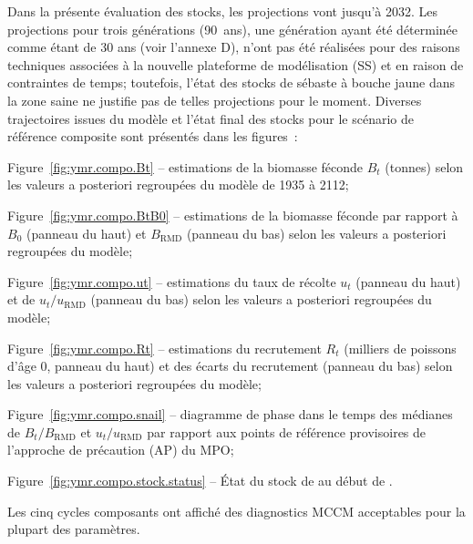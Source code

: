 \documentclass[11pt]{book}
\newcommand{\Bmsy}{B_\text{RMD}}
\newcommand{\umsy}{u_\text{RMD}}
\begin{document}
Dans la pr\'{e}sente \'{e}valuation des stocks, les projections vont jusqu'\`{a} 2032. 
Les projections pour trois g\'{e}n\'{e}rations (90~ans), une g\'{e}n\'{e}ration ayant \'{e}t\'{e} d\'{e}termin\'{e}e comme \'{e}tant de 30 ans (voir l'annexe D), n'ont pas \'{e}t\'{e} r\'{e}alis\'{e}es pour des raisons techniques associ\'{e}es \`{a} la nouvelle plateforme de mod\'{e}lisation (SS) et en raison de contraintes de temps; toutefois, l'\'{e}tat des stocks de s\'{e}baste \`{a} bouche jaune dans la zone saine ne justifie pas de telles projections pour le moment.
Diverses trajectoires issues du mod\`{e}le et l'\'{e}tat final des stocks pour le sc\'{e}nario de r\'{e}f\'{e}rence composite sont pr\'{e}sent\'{e}s dans les figures~:
\begin{itemize_csas}{}{}
  \item Figure~\ref{fig:ymr.compo.Bt}     -- estimations de la biomasse f\'{e}conde $B_t$ (tonnes) selon les valeurs a posteriori regroup\'{e}es du mod\`{e}le de 1935 \`{a} 2112;
  \item Figure~\ref{fig:ymr.compo.BtB0}   -- estimations de la biomasse f\'{e}conde par rapport \`{a} $B_0$ (panneau du haut) et $\Bmsy$ (panneau du bas) selon les valeurs a posteriori regroup\'{e}es du mod\`{e}le;
  \item Figure~\ref{fig:ymr.compo.ut}     -- estimations du taux de r\'{e}colte $u_t$ (panneau du haut) et de $u_t/\umsy$ (panneau du bas) selon les valeurs a posteriori regroup\'{e}es du mod\`{e}le;
  \item Figure~\ref{fig:ymr.compo.Rt}     -- estimations du recrutement $R_t$ (milliers de poissons d'\^{a}ge 0, panneau du haut) et des \'{e}carts du recrutement (panneau du bas) selon les valeurs a posteriori regroup\'{e}es du mod\`{e}le;
  \item Figure~\ref{fig:ymr.compo.snail}  -- diagramme de phase dans le temps des m\'{e}dianes de $B_t/\Bmsy$ et $u_t/\umsy$ par rapport aux points de r\'{e}f\'{e}rence provisoires de l'approche de pr\'{e}caution (AP) du MPO;
  \item Figure~\ref{fig:ymr.compo.stock.status} -- \'{E}tat du stock de \BCa{} au d\'{e}but de \currYear{}.
\end{itemize_csas}

Les cinq cycles composants ont affich\'{e} des diagnostics MCCM acceptables pour la plupart des param\`{e}tres.
\end{document}
